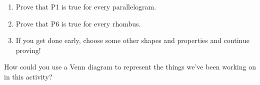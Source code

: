 \documentclass[nooutcomes,noauthor, handout]{ximera}
\begin{document}
\begin{problem}
\begin{enumerate}
	\item Prove that P1 is true for every parallelogram.
	\item Prove that P6 is true for every rhombus.
	\item If you get done early, choose some other shapes and properties and continue proving!
\end{enumerate}
\end{problem}


\begin{problem}
How could you use a Venn diagram to represent the things we've been working on in this activity?
\end{problem}





%
%
%




%
%
%
\end{document}
